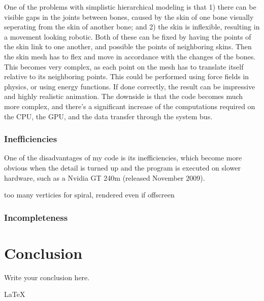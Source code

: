 \documentclass[journal]{IEEEtran}
\begin{document}
One of the problems with simplistic hierarchical modeling is that 1) there can be visible gaps in the joints between bones,  caused by the skin of one bone visually seperating from the skin of another bone; and 2) the skin is inflexible, resulting in a movement looking robotic. Both of these can be fixed by having the points of the skin link to one another, and possible the points of neighboring skins. Then the skin mesh has to flex and move in accordance with the changes of the bones. This becomes very complex, as each point on the mesh has to translate itself relative to its neighboring points. This could be performed using force fields in physics, or using energy functions. If done correctly, the result can be impressive and highly realistic animation. The downside is that the code becomes much more complex, and there's a significant increase of the computations required on the CPU, the GPU, and the data transfer through the system bus.

\subsubsection{Inefficiencies}

One of the disadvantages of my code is its inefficiencies, which become more obvious when the detail is turned up and the program is executed on slower hardware, such as a Nvidia GT 240m (released November 2009).

too many verticies for spiral, rendered even if offscreen

\subsubsection{Incompleteness}


\section{Conclusion}
Write your conclusion here.

\LaTeX{}
\end{document}
